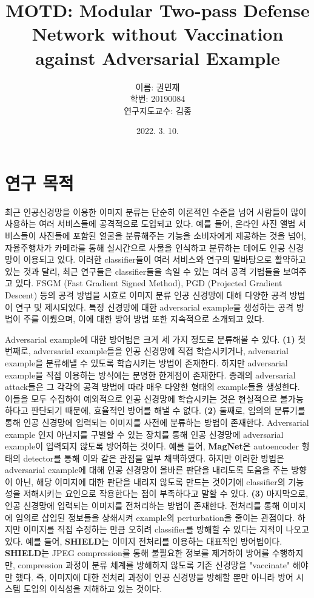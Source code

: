 \documentclass{article}
\title{MOTD: Modular Two-pass Defense Network without Vaccination against Adversarial Example}
\author{이름: 권민재\\학번: 20190084\\연구지도교수: 김종}
\date{2022. 3. 10.}
\begin{document}
\maketitle\thispagestyle{fancy}

\noindent\makebox[\linewidth]{\rule{\textwidth}{0.4pt}}

\section{연구 목적}

최근 인공신경망을 이용한 이미지 분류는 단순히 이론적인 수준을 넘어 사람들이 많이 사용하는 여러 서비스들에 공격적으로 도입되고 있다. 예를 들어, 온라인 사진 앨범 서비스들이 사진들에 포함된 얼굴을 분류해주는 기능을 소비자에게 제공하는 것을 넘어, 자율주행차가 카메라를 통해 실시간으로 사물을 인식하고 분류하는 데에도 인공 신경망이 이용되고 있다. 이러한 classifier들이 여러 서비스와 연구의 밑바탕으로 활약하고 있는 것과 달리, 최근 연구들은 classifier들을 속일 수 있는 여러 공격 기법들을 보여주고 있다. FSGM (Fast Gradient Signed Method), PGD (Projected Gradient Descent) 등의 공격 방법을 시효로 이미지 분류 인공 신경망에 대해 다양한 공격 방법이 연구 및 제시되었다. 특정 신경망에 대한 adversarial example을 생성하는 공격 방법이 주를 이뤘으며, 이에 대한 방어 방법 또한 지속적으로 소개되고 있다.

Adversarial example에 대한 방어법은 크게 세 가지 정도로 분류해볼 수 있다. \textbf{(1)} 첫번째로, adversarial example들을 인공 신경망에 직접 학습시키거나, adversarial example을 분류해낼 수 있도록 학습시키는 방법이 존재한다. 하지만 adversarial example을 직접 이용하는 방식에는 분명한 한계점이 존재한다. 종래의 adversarial attack들은 그 각각의 공격 방법에 따라 매우 다양한 형태의 example들을 생성한다. 이들을 모두 수집하여 예외적으로 인공 신경망에 학습시키는 것은 현실적으로 불가능하다고 판단되기 때문에, 효율적인 방어를 해낼 수 없다. \textbf{(2)} 둘째로, 임의의 분류기를 통해 인공 신경망에 입력되는 이미지를 사전에 분류하는 방법이 존재한다. Adversarial example 인지 아닌지를 구별할 수 있는 장치를 통해 인공 신경망에 adversarial example이 입력되지 않도록 방어하는 것이다. 예를 들어, \textbf{MagNet}은 autoencoder 형태의 detector를 통해 이와 같은 관점을 일부 채택하였다. 하지만 이러한 방법은 adversarial example에 대해 인공 신경망이 올바른 판단을 내리도록 도움을 주는 방향이 아닌, 해당 이미지에 대한 판단을 내리지 않도록 만드는 것이기에 classifier의 기능성을 저해시키는 요인으로 작용한다는 점이 부족하다고 말할 수 있다. \textbf{(3)} 마지막으로, 인공 신경망에 입력되는 이미지를 전처리하는 방법이 존재한다. 전처리를 통해 이미지에 임의로 삽입된 정보들을 상쇄시켜 example의 perturbation을 줄이는 관점이다. 하지만 이미지를 직접 수정하는 만큼 오히려 classifier를 방해할 수 있다는 지적이 나오고 있다. 예를 들어, \textbf{SHIELD}는 이미지 전처리를 이용하는 대표적인 방어법이다. \textbf{SHIELD}는 JPEG compression를 통해 불필요한 정보를 제거하여 방어를 수행하지만, compression 과정이 분류 체계를 방해하지 않도록 기존 신경망을 "vaccinate" 해야만 했다. \cite{das2018shield} 즉, 이미지에 대한 전처리 과정이 인공 신경망을 방해할 뿐만 아니라 방어 시스템 도입의 이식성을 저해하고 있는 것이다.
\end{document}
